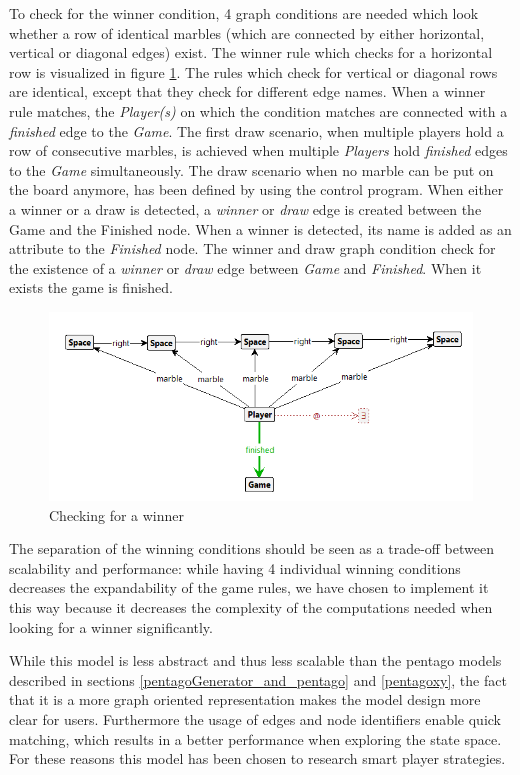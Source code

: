 \vspace{6pt}

To check for the winner condition, 4 graph conditions are needed which look whether a row of identical marbles (which are connected by either horizontal, vertical or diagonal edges) exist.
The winner rule which checks for a horizontal row is visualized in figure \ref{fig:endgame1}.
The rules which check for vertical or diagonal rows are identical, except that they check for different edge names.
When a winner rule matches, the \textit{Player(s)} on which the condition matches are connected with a \textit{finished} edge to the \textit{Game}.
The first draw scenario, when multiple players hold a row of consecutive marbles, is achieved when multiple \textit{Players} hold \textit{finished} edges to the \textit{Game} simultaneously.
The draw scenario when no marble can be put on the board anymore, has been defined by using the control program.
When either a winner or a draw is detected, a \textit{winner} or \textit{draw} edge is created between the Game and the Finished node. When a winner is detected, its name is added as an attribute to the \textit{Finished} node. The winner and draw graph condition check for the existence of a \textit{winner} or \textit{draw} edge between \textit{Game} and \textit{Finished}. When it exists the game is finished.

\begin{figure}[h]
    \centering
    \includegraphics[scale=0.5,clip]{Images/endgame_puregraph.png}
    \caption{Checking for a winner}
    \label{fig:endgame1}
\end{figure}

\vspace{6pt}

The separation of the winning conditions should be seen as a trade-off between scalability and performance: while having 4 individual winning conditions decreases the expandability of the game rules, we have chosen to implement it this way because it decreases the complexity of the computations needed when looking for a winner significantly.

\vspace{6pt}

While this model is less abstract and thus less scalable than the pentago models described in sections \ref{pentagoGenerator_and_pentago} and \ref{pentagoxy}, the fact that it is a more graph oriented representation makes the model design more clear for users.
Furthermore the usage of edges and node identifiers enable quick matching, which results in a better performance when exploring the state space.
For these reasons this model has been chosen to research smart player strategies.